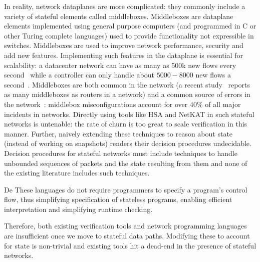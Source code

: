 In reality, network dataplanes are more complicated: they commonly include a variety of stateful elements called middleboxes. Middleboxes
are dataplane elements implemented using general purpose computers (and programmed in C or other Turing complete languages) used to provide functionality not
expressible in switches. Middleboxes are used to improve network performance, security and add new features. Implementing such features in the dataplane is
essential for scalability: a datacenter network can have as many as 500k new flows every second~\cite{benson2010network} while a controller can only handle about
$5000-8000$ new  flows a second~\cite{}. Middleboxes are both common in the network (a recent study~\cite{sherry2012making} reports as many middleboxes as routers
in a network) and a common source of errors in the network~\cite{potharaju2013demystifying}: middlebox misconfigurations account for over $40\%$ of all major
incidents in networks. Directly using tools like HSA and NetKAT in such stateful networks is untenable: the rate of churn is too great to scale verification
in this manner. Further, naively extending these techniques to reason about state (instead of working on snapshots) renders their decision procedures undecidable.
Decision procedures for stateful networks must include techniques to handle unbounded sequences of packets and the state resulting from them and none of the
existing literature includes such techniques.

De
These languages do not require programmers to specify a program's control flow, thus simplifying specification of stateless programs, enabling efficient
interpretation and simplifying runtime checking.


Therefore, both existing verification tools and network programming languages are insufficient once we move to stateful data paths. Modifying these to account
for state is non-trivial and existing tools hit a dead-end in the presence of stateful networks.
